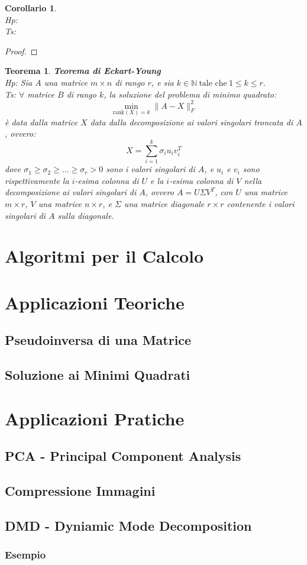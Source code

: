 \documentclass[11pt]{article}
\newtheorem{theorem}{Teorema}
\newtheorem{corollary}{Corollario}
\begin{document}
\begin{corollary}
\textbf{}\\
\textit{Hp:}\\
\textit{Ts:} 
\end{corollary}
\begin{proof}
\end{proof}

\begin{theorem}
\textbf{Teorema di Eckart-Young}\\
\textit{Hp:} Sia $A$ una matrice $m \times n$ di rango $r$, e sia $k \in \mathbb{N} \ \text{tale che} \ 1 \leq k \leq r$.\\
\textit{Ts:} $\forall$ matrice $B$ di rango $k$, la soluzione del problema di minimo quadrato:
\[
\min_{\text{rank}(X) = k} \|A - X\|_F^2
\]
è data dalla matrice $X$ data dalla decomposizione ai valori singolari troncata di $A$, ovvero:
\[
X = \sum_{i=1}^k \sigma_i u_i v_i^T
\]
dove $\sigma_1 \geq \sigma_2 \geq \ldots \geq \sigma_r > 0$ sono i valori singolari di $A$, e $u_i$ e $v_i$ sono rispettivamente la $i$-esima colonna di $U$ e la $i$-esima colonna di $V$ nella decomposizione ai valori singolari di $A$, ovvero $A = U \Sigma V^T$, con $U$ una matrice $m \times r$, $V$ una matrice $n \times r$, e $\Sigma$ una matrice diagonale $r \times r$ contenente i valori singolari di $A$ sulla diagonale.

\end{theorem}

\newpage
\section{Algoritmi per il Calcolo}
\section{Applicazioni Teoriche}
\subsection{Pseudoinversa di una Matrice}
\subsection{Soluzione ai Minimi Quadrati}
\section{Applicazioni Pratiche}
\subsection{PCA - Principal Component Analysis}
\subsection{Compressione Immagini}
\subsection{DMD - Dyniamic Mode Decomposition}
\subsubsection{Esempio}
\end{document}
